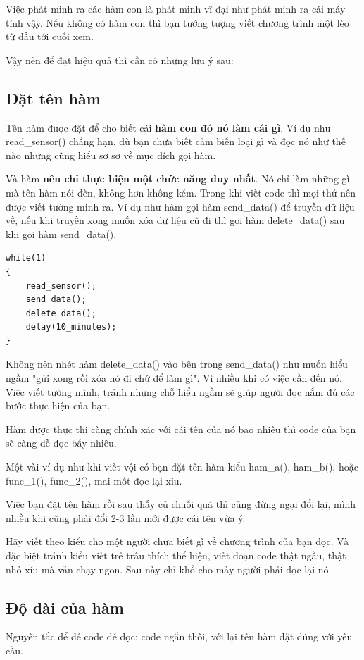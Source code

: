 Việc phát minh ra các hàm con là phát minh vĩ đại như phát minh ra cái máy tính vậy. Nếu không có hàm con thì bạn tưởng tượng viết chương trình một lèo từ đầu tới cuối xem.

Vậy nên để đạt hiệu quả thì cần có những lưu ý sau:
\subsection{Đặt tên hàm}

Tên hàm được đặt để cho biết cái \textbf{hàm con đó nó làm cái gì}. Ví dụ như read\_sensor() chẳng hạn, dù bạn chưa biết cảm biến loại gì và đọc nó như thế nào nhưng cũng hiểu sơ sơ về mục đích gọi hàm.

Và hàm \textbf{nên chỉ thực hiện một chức năng duy nhất}. Nó chỉ làm những gì mà tên hàm nói đến, không hơn không kém. Trong khi viết code thì mọi thứ nên được viết tường minh ra. Ví dụ như hàm gọi hàm send\_data() để truyền dữ liệu về, nếu khi truyền xong muốn xóa dữ liệu cũ đi thì gọi hàm delete\_data() sau khi gọi hàm send\_data().
\begin{lstlisting}
while(1)
{
	read_sensor();
	send_data();
	delete_data();
	delay(10_minutes);
}
\end{lstlisting}
Không nên nhét hàm delete\_data() vào bên trong send\_data() như muốn hiểu ngầm "gửi xong rồi xóa nó đi chứ để làm gì". Vì nhiều khi có việc cần đến nó. Việc viết tường mình, tránh những chỗ hiểu ngầm sẽ giúp người đọc nắm đủ các bước thực hiện của bạn. 

Hàm được thực thi càng chính xác với cái tên của nó bao nhiêu thì code của bạn sẽ càng dễ đọc bấy nhiêu. 

Một vài ví dụ như khi viết vội có bạn đặt tên hàm kiểu ham\_a(), ham\_b(), hoặc func\_1(), func\_2(), mai mốt đọc lại xỉu.

Việc bạn đặt tên hàm rồi sau thấy củ chuối quá thì cũng đừng ngại đổi lại, mình nhiều khi cũng phải đổi 2-3 lần mới được cái tên vừa ý.

Hãy viết theo kiểu cho một người chưa biết gì về chương trình của bạn đọc. Và đặc biệt tránh kiểu viết trẻ trâu thích thể hiện, viết đoạn code thật ngầu, thật nhỏ xíu mà vẫn chạy ngon. Sau này chỉ khổ cho mấy người phải đọc lại nó.
\subsection{Độ dài của hàm}

Nguyên tắc để dễ code dễ đọc: code ngắn thôi, với lại tên hàm đặt đúng với yêu cầu. 

